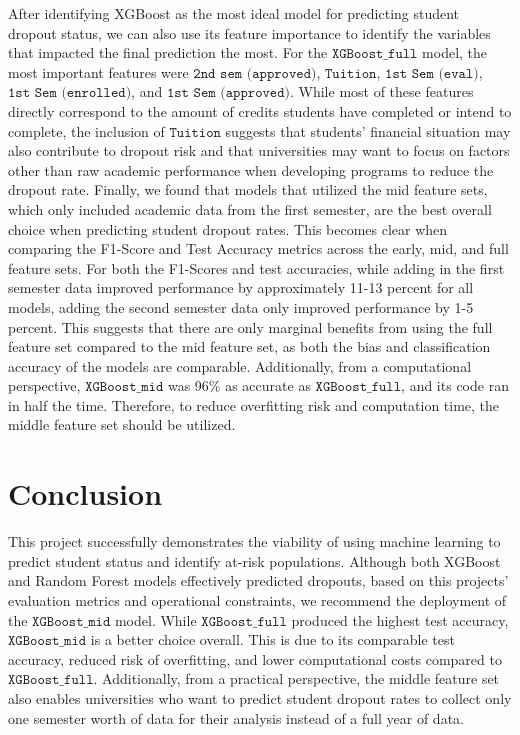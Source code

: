 \documentclass[11pt]{article}
\begin{document}
After identifying XGBoost as the most ideal model for predicting student dropout status, we can also use its feature importance to identify the variables that impacted the final prediction the most. For the $\texttt{XGBoost\_full}$ model, the most important features were $\texttt{2nd sem (approved)}$, $\texttt{Tuition}$, $\texttt{1st Sem (eval)}$, $\texttt{1st Sem (enrolled)}$, and $\texttt{1st Sem (approved)}$. While most of these features directly correspond to the amount of credits students have completed or intend to complete, the inclusion of $\texttt{Tuition}$ suggests that students’ financial situation may also contribute to dropout risk and that universities may want to focus on factors other than raw academic performance when developing programs to reduce the dropout rate.
Finally, we found that models that utilized the mid feature sets, which only included academic data from the first semester, are the best overall choice when predicting student dropout rates. This becomes clear when comparing the F1-Score and Test Accuracy metrics across the early, mid, and full feature sets. For both the F1-Scores and test accuracies, while adding in the first semester data improved performance by approximately 11-13 percent for all models, adding the second semester data only improved performance by 1-5 percent. This suggests that there are only marginal benefits from using the full feature set compared to the mid feature set, as both the bias and classification accuracy of the models are comparable. Additionally, from a computational perspective, $\texttt{XGBoost\_mid}$ was 96\% as accurate as $\texttt{XGBoost\_full}$, and its code ran in half the time. Therefore, to reduce overfitting risk and computation time, the middle feature set should be utilized. 

\section{Conclusion}

This project successfully demonstrates the viability of using machine learning to predict student status and identify at-risk populations. Although both XGBoost and Random Forest models effectively predicted dropouts, based on this projects’ evaluation metrics and operational constraints, we recommend the deployment of the $\texttt{XGBoost\_mid}$ model.
While $\texttt{XGBoost\_full}$ produced the highest test accuracy, $\texttt{XGBoost\_mid}$ is a better choice overall. This is due to its comparable test accuracy, reduced risk of overfitting, and lower computational costs compared to $\texttt{XGBoost\_full}$. Additionally, from a practical perspective, the middle feature set also enables universities who want to predict student dropout rates to collect only one semester worth of data for their analysis instead of a full year of data.
\end{document}
